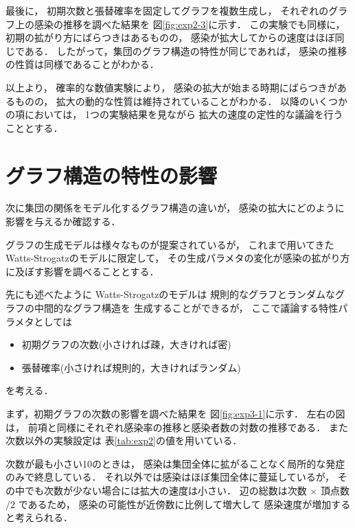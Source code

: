 \documentclass[10pt,oneside]{scrartcl}
\begin{document}
最後に，
初期次数と張替確率を固定してグラフを複数生成し，
それぞれのグラフ上の感染の推移を調べた結果を
図\ref{fig:exp2-3}に示す．
この実験でも同様に，
初期の拡がり方にばらつきはあるものの，
感染が拡大してからの速度はほぼ同じである．
したがって，集団のグラフ構造の特性が同じであれば，
感染の推移の性質は同様であることがわかる．

\begin{figure*}%
  \centering
\end{figure*}

以上より，
確率的な数値実験により，
感染の拡大が始まる時期にばらつきがあるものの，
拡大の動的な性質は維持されていることがわかる．
以降のいくつかの項においては，
1つの実験結果を見ながら
拡大の速度の定性的な議論を行うこととする．

\section{グラフ構造の特性の影響}
\label{sec:org87d3ddf}

次に集団の関係をモデル化するグラフ構造の違いが，
感染の拡大にどのように影響を与えるか確認する．

グラフの生成モデルは様々なものが提案されているが，
これまで用いてきた
Watts-Strogatzのモデルに限定して，
その生成パラメタの変化が感染の拡がり方に及ぼす影響を調べることとする．

先にも述べたように
Watts-Strogatzのモデルは
規則的なグラフとランダムなグラフの中間的なグラフ構造を
生成することができるが，
ここで議論する特性パラメタとしては
\begin{itemize}
\item 初期グラフの次数(小さければ疎，大きければ密)
\item 張替確率(小さければ規則的，大きければランダム)
\end{itemize}
を考える．

まず，初期グラフの次数の影響を調べた結果を
図\ref{fig:exp3-1}に示す．
左右の図は，
前項と同様にそれぞれ感染率の推移と感染者数の対数の推移である．
また次数以外の実験設定は
表\ref{tab:exp2}の値を用いている．

次数が最も小さい10のときは，
感染は集団全体に拡がることなく局所的な発症のみで終息している．
それ以外では感染はほぼ集団全体に蔓延しているが，
その中でも次数が少ない場合には拡大の速度は小さい．
辺の総数は次数 \(\times\) 頂点数 \(/2\) であるため，
感染の可能性が近傍数に比例して増大して
感染速度が増加すると考えられる．
\end{document}
